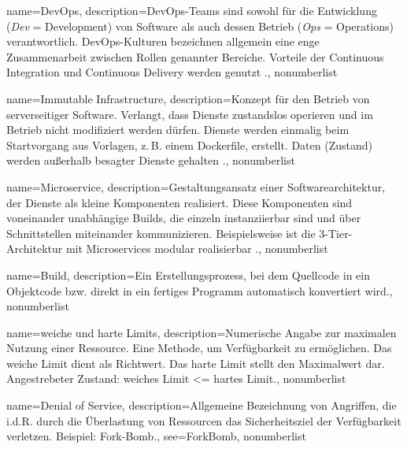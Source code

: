 {%
  name={DevOps},
  description={DevOps-Teams sind sowohl für die Entwicklung (\emph{Dev} = Development) von Software als auch dessen Betrieb (\emph{Ops} = Operations) verantwortlich. DevOps-Kulturen bezeichnen allgemein eine enge Zusammenarbeit zwischen Rollen genannter Bereiche. Vorteile der Continuous Integration und Continuous Delivery werden genutzt \cite{devops}.},
  nonumberlist
}

{%
  name={Immutable Infrastructure},
  description={Konzept für den Betrieb von serverseitiger Software. Verlangt, dass Dienste zustandslos operieren und im Betrieb nicht modifiziert werden dürfen. Dienste werden einmalig beim Startvorgang aus Vorlagen, z.\,B. einem Dockerfile, erstellt. Daten (Zustand) werden außerhalb besagter Dienste gehalten \cite{unikernelMeetsDocker}\cite{immutableInfrastructure}.},
  nonumberlist
}

{%
  name={Microservice},
  description={Gestaltungsansatz einer Softwarearchitektur, der Dienste als kleine Komponenten realisiert. Diese Komponenten sind voneinander unabhängige Builds, die einzeln instanziierbar sind und über Schnittstellen miteinander kommunizieren. Beispielsweise ist die 3-Tier-Ar\-chi\-tek\-tur mit Microservices modular realisierbar \cite{microservices}.},
  nonumberlist
}

{%
  name={Build},
  description={Ein Erstellungsprozess, bei dem Quellcode in ein Objektcode bzw. direkt in ein fertiges Programm automatisch konvertiert wird.},
  nonumberlist
}

{%
  name={weiche und harte Limits},
  description={Numerische Angabe zur maximalen Nutzung einer Ressource. Eine Methode, um Verfügbarkeit zu ermöglichen. Das weiche Limit dient als Richtwert. Das harte Limit stellt den Maximalwert dar. Angestrebeter Zustand: weiches Limit \textless= hartes Limit.},
  nonumberlist
}

{%
  name={Denial of Service},
  description={Allgemeine Bezeichnung von Angriffen, die i.d.R. durch die Überlastung von Ressourcen das Sicherheitsziel der Verfügbarkeit verletzen. Beispiel: Fork-Bomb.},
  see={ForkBomb},
  nonumberlist
}

